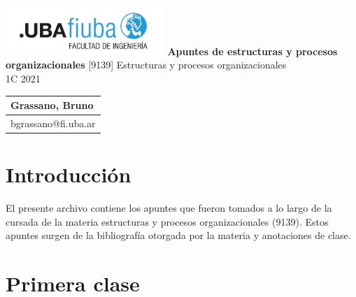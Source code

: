 \documentclass[titlepage,a4paper]{article}
\begin{document}
\begin{titlepage} %
	\hfill\includegraphics[width=6cm]{logofiuba.jpg}
    \centering
    \vfill
    \Huge \textbf{Apuntes de estructuras y procesos organizacionales}
    \vskip2cm
    \Large [9139] Estructuras y procesos organizacionales\\
    1C 2021
    \vfill
    \begin{tabular}{ | l | } %
      \hline
      Grassano, Bruno \\ \hline
      bgrassano@fi.uba.ar \\ \hline
  	\end{tabular}
    \vfill
    \vfill
\end{titlepage}

\tableofcontents %

\newpage

\section{Introducción}\label{sec:intro}
El presente archivo contiene los apuntes que fueron tomados a lo largo de la cursada de la materia estructuras y procesos organizacionales (9139). Estos apuntes surgen de la bibliografía otorgada por la materia y anotaciones de clase. 

\section*{Primera clase}




\end{document}
